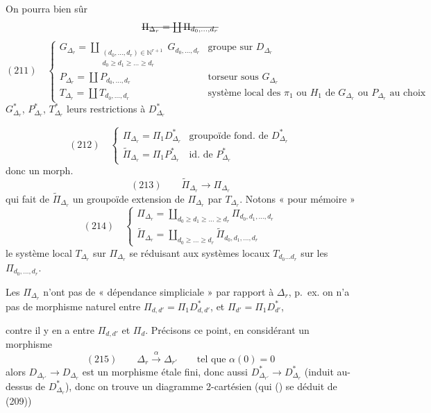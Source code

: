 \documentclass[11pt,a4paper]{article}
\begin{document}
On pourra bien sûr
\[
  \text{\struck{$\Pi_{\Delta_r} = \coprod \Pi_{d_0,\dots,d_r}$}}
\]
\[
  (211) \quad
  \begin{cases}
    G_{\Delta_r} = \coprod\limits_{\substack{(d_0,\dots,d_r) \in \mathbb{N}^{r+1} \\ d_0 \geqslant d_1 \geqslant \dots \geqslant d_r}} G_{d_0,\dots,d_r}
    & \text{groupe sur } D_{\Delta_r} \\
    P_{\Delta_r} = \coprod P_{d_0,\dots,d_r} & \text{torseur sous } G_{\Delta_r} \\
    T_{\Delta_r} = \coprod T_{d_0,\dots,d_r} & \text{système local des } \pi_1 \text{ ou } H_1
    \text{ de } G_{\Delta_r} \text{ ou } P_{\Delta_r} \text{ au choix}
  \end{cases}
\]
$G^{*}_{\Delta_r}$, $P^{*}_{\Delta_r}$, $T^{*}_{\Delta_r}$ leurs restrictions à $D^{*}_{\Delta_r}$

\[
  (212) \quad
  \begin{cases}
    \Pi_{\Delta_r} = \Pi_1 D^{*}_{\Delta_r} & \text{groupoïde fond. de } D^{*}_{\Delta_r} \\
    \widetilde{\Pi}_{\Delta_r} = \Pi_1 P^{*}_{\Delta_r} & \text{id.\ de } P^{*}_{\Delta_r}
  \end{cases}
\]
donc un morph.
\[
  (213) \qquad \widetilde{\Pi}_{\Delta_r} \longrightarrow \Pi_{\Delta_r}
\]
qui fait de $\widetilde{\Pi}_{\Delta_r}$ un groupoïde extension de $\Pi_{\Delta_r}$ par
$T_{\Delta_r}$. Notons « pour mémoire »
\[
  (214) \quad
  \begin{cases}
    \Pi_{\Delta_r} = \coprod\limits_{d_0 \geqslant d_1 \geqslant \dots \geqslant d_r} \Pi_{d_0,d_1,\dots,d_r} \\
    \widetilde{\Pi}_{\Delta_r} = \coprod\limits_{d_0 \geqslant \dots \geqslant d_r} \widetilde{\Pi}_{d_0,d_1,\dots,d_r}
  \end{cases}
\]
le système local $T_{\Delta_r}$ sur $\Pi_{\Delta_r}$  se réduisant aux
systèmes locaux $T_{d_0 \dots d_r}$ sur les $\Pi_{d_0,\dots,d_r}$.

Les $\Pi_{\Delta_r}$ n'ont pas de « dépendance simpliciale » par rapport à
$\Delta_r$, p.~ex. on n'a pas de morphisme naturel entre
$\Pi_{d,d'} = \Pi_1 D^{*}_{d,d'}$, et $\Pi_{d'} = \Pi_1 D^{*}_{d'}$, 

contre il y en a entre $\Pi_{d,d'}$ et $\Pi_d$. Précisons ce point, en considérant
un morphisme
\[
  (215) \qquad \Delta_r \xrightarrow{\ \alpha\ } \Delta_{r'} \qquad \text{tel que } \alpha(0) = 0
\]
alors $D_{\Delta_{r'}} \to D_{\Delta_r}$ est un morphisme étale fini, donc aussi
$D^{*}_{\Delta_{r'}} \to D^{*}_{\Delta_r}$ (induit au-dessus de $D^{*}_{\Delta_r}$),
donc on trouve un diagramme 2-cartésien (qui \struck{\ill{}} \add{\ill{}}
() \ill{} se déduit de (209))
\end{document}
